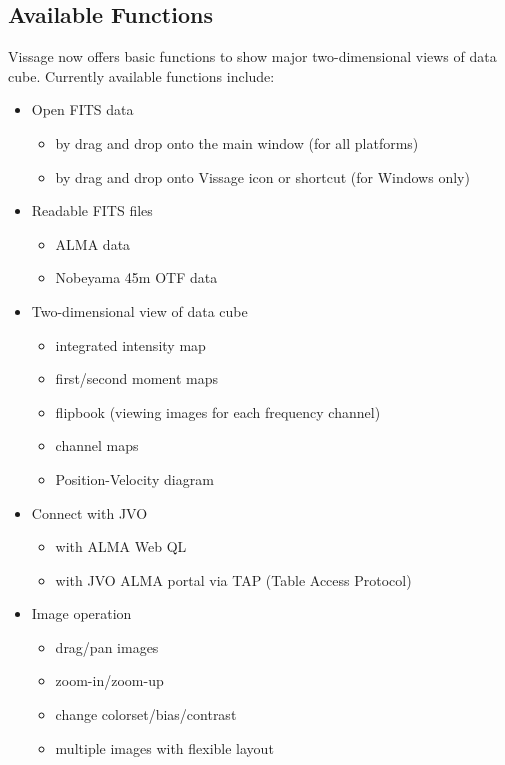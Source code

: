 \documentclass[11pt,twoside]{article}
\begin{document}
\subsection{Available Functions}
Vissage now offers basic functions to show major two-dimensional views of 
data cube. Currently available functions include:
\begin{itemize}
  \item Open FITS data
    \begin{itemize}
      \item by drag and drop onto the main window (for all platforms)
      \item by drag and drop onto Vissage icon or shortcut (for Windows only)
    \end{itemize}
  \item Readable FITS files
    \begin{itemize}
      \item ALMA data
      \item Nobeyama 45m OTF data
    \end{itemize}
  \item Two-dimensional view of data cube
    \begin{itemize}
      \item integrated intensity map
      \item first/second moment maps
      \item flipbook (viewing images for each frequency channel)
      \item channel maps
      \item Position-Velocity diagram
    \end{itemize}
  \item Connect with JVO
    \begin{itemize}
      \item with ALMA Web QL
      \item with JVO ALMA portal via TAP (Table Access Protocol)
    \end{itemize}
  \item Image operation
    \begin{itemize}
      \item drag/pan images
      \item zoom-in/zoom-up
      \item change colorset/bias/contrast
      \item multiple images with flexible layout
    \end{itemize}
\end{itemize}
\end{document}
